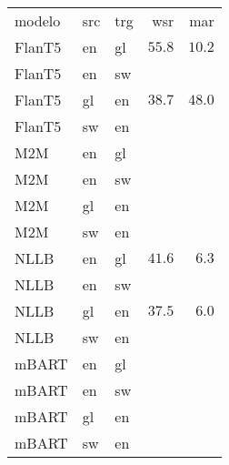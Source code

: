\begin{tabular}{lllrr}
modelo & src & trg & wsr & mar \\
FlanT5 & en & gl & $55.8$ & $10.2$ \\
FlanT5 & en & sw &  &  \\
FlanT5 & gl & en & $38.7$ & $48.0$ \\
FlanT5 & sw & en &  &  \\
M2M & en & gl &  &  \\
M2M & en & sw &  &  \\
M2M & gl & en &  &  \\
M2M & sw & en &  &  \\
NLLB & en & gl & $41.6$ & $6.3$ \\
NLLB & en & sw &  &  \\
NLLB & gl & en & $37.5$ & $6.0$ \\
NLLB & sw & en &  &  \\
mBART & en & gl &  &  \\
mBART & en & sw &  &  \\
mBART & gl & en &  &  \\
mBART & sw & en &  &  \\
\end{tabular}
